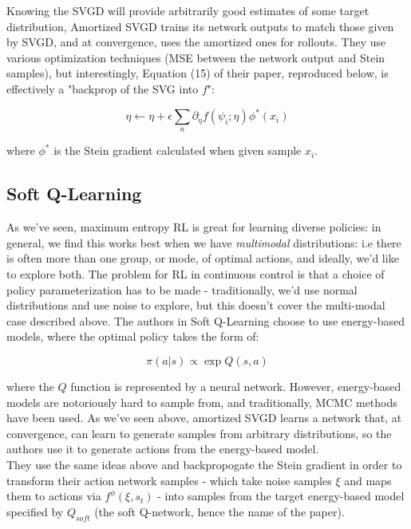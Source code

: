 \documentclass[12pt]{article}
\begin{document}
\noindent Knowing the SVGD will provide arbitrarily good estimates of some target distribution, Amortized SVGD trains its network outputs to match those given by SVGD, and at convergence, uses the amortized ones for rollouts. They use various optimization techniques (MSE between the network output and Stein samples), but interestingly, Equation (15) of their paper, reproduced below, is effectively a "backprop of the SVG into $f$":

\begin{equation}
    \eta \leftarrow \eta + \epsilon \sum_n \partial_\eta f(\psi_i; \eta) \phi^*(x_i)  
\end{equation}

\noindent where $\phi^*$ is the Stein gradient calculated when given sample $x_i$. 

\subsection{Soft Q-Learning}

\noindent As we've seen, maximum entropy RL is great for learning diverse policies: in general, we find this works best when we have \textit{multimodal} distributions: i.e there is often more than one group, or mode, of optimal actions, and ideally, we'd like to explore both. The problem for RL in continuous control is that a choice of policy parameterization has to be made - traditionally, we'd use normal distributions and use noise to explore, but this doesn't cover the multi-modal case described above. The authors in Soft Q-Learning choose to use energy-based models, where the optimal policy takes the form of:

\begin{equation}
    \pi(a | s) \propto \exp Q(s, a)
\end{equation}

\noindent  where the $Q$ function is represented by a neural network. However, energy-based models are notoriously hard to sample from, and traditionally, MCMC methods have been used. As we've seen above, amortized SVGD learns a network that, at convergence, can learn to generate samples from arbitrary distributions, so the authors use it to generate actions from the energy-based model. \\

\noindent  They use the same ideas above and backpropogate the Stein gradient in order to transform their action network samples - which take noise samples $\xi$ and maps them to actions via $f^\phi(\xi, s_t)$ - into samples from the target energy-based model specified by $Q_{soft}$ (the soft Q-network, hence the name of the paper).  \\
\end{document}

